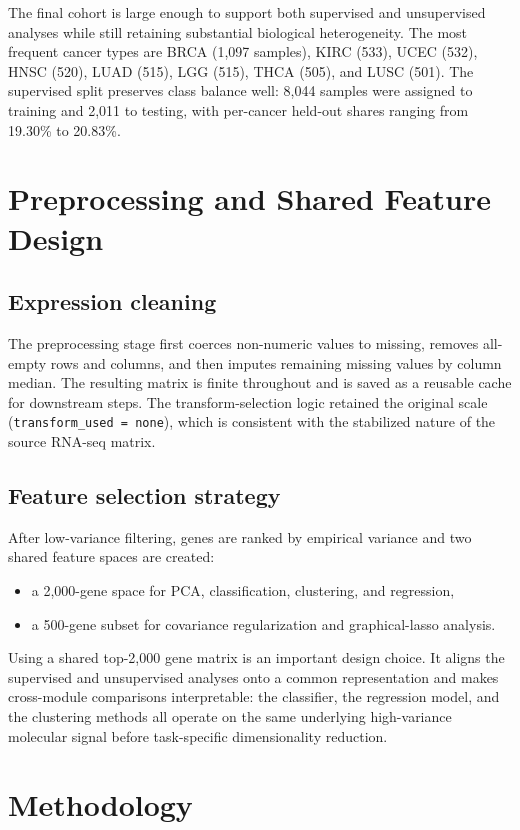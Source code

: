 \documentclass[11pt]{article}
\begin{document}
The final cohort is large enough to support both supervised and unsupervised analyses while still retaining substantial biological heterogeneity. The most frequent cancer types are BRCA (1,097 samples), KIRC (533), UCEC (532), HNSC (520), LUAD (515), LGG (515), THCA (505), and LUSC (501). The supervised split preserves class balance well: 8,044 samples were assigned to training and 2,011 to testing, with per-cancer held-out shares ranging from 19.30\% to 20.83\%.

\section{Preprocessing and Shared Feature Design}
\subsection{Expression cleaning}
The preprocessing stage first coerces non-numeric values to missing, removes all-empty rows and columns, and then imputes remaining missing values by column median. The resulting matrix is finite throughout and is saved as a reusable cache for downstream steps. The transform-selection logic retained the original scale (\texttt{transform\_used = none}), which is consistent with the stabilized nature of the source RNA-seq matrix.

\subsection{Feature selection strategy}
After low-variance filtering, genes are ranked by empirical variance and two shared feature spaces are created:

\begin{itemize}
  \item a 2,000-gene space for PCA, classification, clustering, and regression,
  \item a 500-gene subset for covariance regularization and graphical-lasso analysis.
\end{itemize}

Using a shared top-2,000 gene matrix is an important design choice. It aligns the supervised and unsupervised analyses onto a common representation and makes cross-module comparisons interpretable: the classifier, the regression model, and the clustering methods all operate on the same underlying high-variance molecular signal before task-specific dimensionality reduction.

\section{Methodology}
\end{document}
